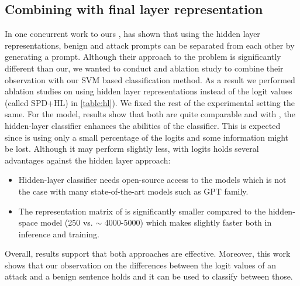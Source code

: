 \subsection{Combining \methodname{} with final layer representation}
\label{app:final_layer}

In one concurrent work to ours \cite{zheng2024promptdriven}, has shown that using the hidden layer representations, benign and attack prompts can be separated from each other by generating a prompt. Although their approach to the problem is significantly different than our, we wanted to conduct and ablation study to combine their observation with our SVM based classification method. As a result we performed ablation studies on using hidden layer representations instead of the logit values (called SPD+HL) in \cref{table:hl}). We fixed the rest of the experimental setting the same. For the \llama{} model, results show that both are quite comparable and with \vicuna{}, the hidden-layer classifier enhances the abilities of the classifier. This is expected since \methodname{} is using only a small percentage of the logits and some information might be lost. Although it may perform slightly less, \methodname{} with logits holds several advantages against the hidden layer approach:
\begin{itemize}
    \item Hidden-layer classifier needs open-source access to the models which is not the case with many state-of-the-art models such as GPT family.
    \item The representation matrix of \methodname{} is significantly smaller compared to the hidden-space model (250 vs. $\sim$ 4000-5000) which makes \methodname{} slightly faster both in inference and training.
\end{itemize}
Overall, results support that both approaches are effective. Moreover, this work shows that our observation on the differences between the logit values of an attack and a benign sentence holds and it can be used to classify between those.

